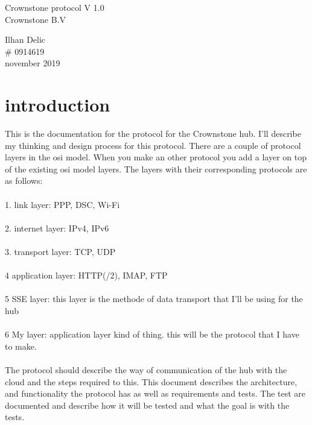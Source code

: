 \documentclass{article}
\begin{document}
\begin{titlepage}
		\begin{center}%
		{\huge{Crownstone protocol V 1.0}}\\ %
		[2cm]
		{\large Crownstone B.V }\\
		[15cm]
		\end{center} 
		\begin{flushright}
		{\large Ilhan Delic \\}
		\# 0914619 \\
		november 2019 \\
		\end{flushright}	
\end{titlepage}
\tableofcontents
\thispagestyle{empty}
\cleardoublepage %
\section{introduction}\label{sec:intro}%
This is the documentation for the protocol for the Crownstone hub. I'll describe my thinking and design process for this protocol. There are a couple of protocol layers in the osi model. When you make an other protocol you add a layer on top of the existing osi model layers. The layers with their corresponding protocols are as follows:\\
\\
1. link layer:  PPP, DSC, Wi-Fi\\
\\
2. internet layer: IPv4, IPv6\\
\\
3. transport layer: TCP, UDP\\
\\
4 application layer: HTTP(/2), IMAP, FTP\\
\\
5 SSE layer: this layer is the methode of data transport that I'll be using for the hub\\
\\
6  My layer: application layer kind of thing. this will be the protocol that I have to make.\\
\\
The protocol should describe the way of communication of the hub with the  cloud and the steps required to this. This document describes the architecture, and functionality the protocol has as well as requirements and tests. The test are documented and describe how it will be tested and what the goal is with the tests. 
\cleardoublepage
\end{document}
